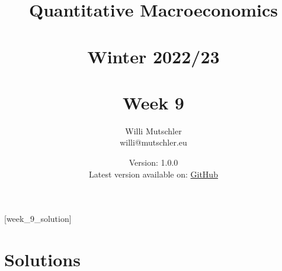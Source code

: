 
\newif\ifDisplaySolutions\DisplaySolutionstrue


\title{Quantitative Macroeconomics\\~\\Winter 2022/23\\~\\Week 9}
\author{Willi Mutschler\\willi@mutschler.eu}
\date{Version: 1.0.0\\Latest version available on: \href{https://github.com/wmutschl/Quantitative-Macroeconomics/releases/latest/download/week_9.pdf}{GitHub}}
\maketitle\thispagestyle{empty}

\newpage
{}[week_9_solution]
\tableofcontents\thispagestyle{empty}\newpage

\setcounter{page}{1}
\newpage
\newpage
\newpage

\printbibliography
\newpage

\ifDisplaySolutions
\newpage
\appendix
\section{Solutions}

\fi
